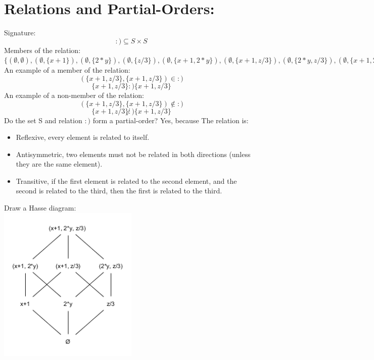 \documentclass{article}
\begin{document}


\section*{Relations and Partial-Orders:}
Signature:
$$ :) \subseteq S \times S$$
Members of the relation:\\
$
\{
(\emptyset,\emptyset), 
(\emptyset, \{x+1\}),
(\emptyset, \{2*y\}), 
(\emptyset, \{z/3\}), 
(\emptyset, \{x+1, 2*y\}), 
(\emptyset, \{x+1, z/3\}), 
(\emptyset, \{2*y, z/3\}), 
(\emptyset, \{x+1, 2*y, z/3\}),
(\{x+1\}, \{x+1\}), 
(\{x+1\}, \{x+1, 2*y\}), 
(\{x+1\}, \{x+1, z/3\}), 
(\{x+1\}, \{x+1, 2*y, z/3\}),
(\{2*y\}, \{2*y\}),
(\{2*y\}, \{x+1, 2*y\}),
(\{2*y\}, \{2*y, z/3\}), 
(\{2*y\}, \{x+1, 2*y, z/3\}),
(\{z/3\}, \{z/3\}),
(\{z/3\}, \{x+1, z/3\}), 
(\{z/3\}, \{2*y, z/3\}),   
(\{z/3\}, \{x+1, 2*y, z/3\}),
(\{x+1, 2*y\}, \{x+1, 2*y\}),  
(\{x+1, 2*y\}, \{x+1, 2*y, z/3\}),
(\{2*y, z/3\}, \{2*y, z/3\}),  
(\{2*y, z/3\}, \{x+1, 2*y, z/3\}),
(\{x+1, z/3\}, \{x+1, z/3\}),  
(\{x+1, z/3\}, \{x+1, 2*y, z/3\}),
(\{x+1, 2*y, z/3\}, \{x+1, 2*y, z/3\})
\}$
\vspace{0.5cm}\\
\noindent An example of a member of the relation:\\
$$(\{x+1, z/3\}, \{x+1, z/3\}) \in :)$$
$$\{x+1, z/3\}:)\{x+1, z/3\}$$
An example of a non-member of the relation:\\
$$(\{x+1, z/3\}, \{x+1, z/3\}) \notin :)$$
$$\{x+1, z/3\}\not:)\{x+1, z/3\}$$
Do the set S and relation $:)$ form a partial-order? Yes, because The relation is:\\
\begin{itemize}
	\item Reflexive, every element is related to itself.
	\item Antisymmetric, two elements must not be related in both directions (unless they are the same element).
	\item Transitive, if the first element is related to the second element, and the second is related to the third, then the first is related to the third.
\end{itemize}
Draw a Hasse diagram:\\
\includegraphics[width=0.5\textwidth]{Hasse}
\pagebreak
\end{document}
